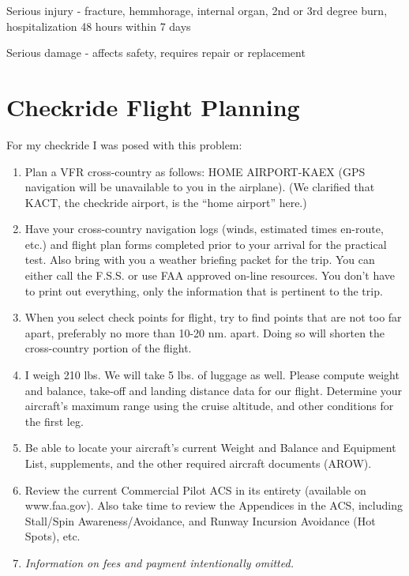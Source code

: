 Serious injury - fracture, hemmhorage, internal organ, 2nd or 3rd degree burn, hospitalization 48 hours within 7 days

Serious damage - affects safety, requires repair or replacement

\section{Checkride Flight Planning}

For my checkride I was posed with this problem:

\begin{enumerate}

\item Plan a VFR cross-country as follows: HOME AIRPORT-KAEX (GPS navigation will be unavailable to you in the airplane). (We clarified that KACT, the checkride airport, is the ``home airport'' here.)

\item Have your cross-country navigation logs (winds, estimated times en-route, etc.) and flight plan forms completed prior to your arrival for the practical test. Also bring with you a weather briefing packet for the trip. You can either call the F.S.S. or use FAA approved on-line resources. You don't have to print out everything, only the information that is pertinent to the trip.

\item When you select check points for flight, try to find points that are not too far apart, preferably no more than 10-20 nm. apart. Doing so will shorten the cross-country portion of the flight.

\item I weigh 210 lbs. We will take 5 lbs. of luggage as well. Please compute weight and balance, take-off and landing distance data for our flight. Determine your aircraft's maximum range using the cruise altitude, and other conditions for the first leg.

\item Be able to locate your aircraft's current Weight and Balance and Equipment List, supplements, and the other required aircraft documents (AROW).

\item Review the current Commercial Pilot ACS in its entirety (available on www.faa.gov). Also take time to review the Appendices in the ACS, including Stall/Spin Awareness/Avoidance, and Runway Incursion Avoidance (Hot Spots), etc.

\item \emph{Information on fees and payment intentionally omitted.}

\end{enumerate}

